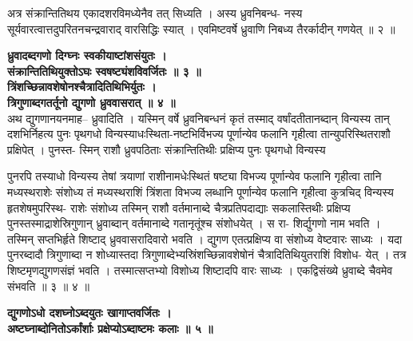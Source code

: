 \documentclass[11pt, openany]{book}
\begin{document}
{{{{\vspace{2mm}
\justifying
 अत्र संक्रान्तितिथय एकादशरविमध्येनैव तत् सिध्यति । अस्य
ध्रुवनिबन्ध-
नस्य सूर्यवारत्वात्तदुपरितनचन्द्रवाराद् वारसिद्धिः स्यात् ।
एवमिष्टवर्षे ध्रुवाणि 
निबध्य तैरर्कादीन् गणयेत् ॥ २ ॥

\vspace{2mm}
\centering
\hspace{-0.75cm}
\textbf{
 ध्रुवादब्दगणो दिग्घ्नः स्वकीयाष्टांशसंयुतः ।\\ 
 \hspace{0.8cm}
 संक्रान्तितिथियुक्तोऽघः स्वषष्ट्यंशविवर्जितः ॥ ३ ॥ \\
 \hspace{-0.75cm}
 त्रिंशच्छिन्नावशेषोनश्चैत्रादितिथिभिर्युतः ।\\
 \hspace{0.3cm}
 त्रिगुणाब्दगतर्तूनो द्युगणो ध्रुववासरात् ॥ ४ ॥ }\\

\vspace{2mm}
\justifying
 अथ द्युगणानयनमाह-- ध्रुवादिति । यस्मिन् वर्षे ध्रुवनिबन्धनं कृतं
तस्माद् 
वर्षांदतीतानब्दान् विन्यस्य तान् दशभिर्निहत्य पुनः पृथगधो
विन्यस्याधःस्थिता-नष्टभिर्विभज्य पूर्णान्येव फलानि गृहीत्वा तान्युपरिस्थितराशौ
प्रक्षिपेत् । पुनस्त-
स्मिन् राशौ ध्रुवपठिताः संक्रान्तितिथीः प्रक्षिप्य पुनः पृथगधो विन्यस्य


\newpage

\justifying
पुनरपि तस्याधो विन्यस्य तेषां त्रयाणां राशीनामधेःस्थितं षष्ट्या विभज्य
पूर्णान्येव फलानि गृहीत्वा तानि मध्यस्थराशेः संशोध्य तं मध्यस्थराशिं त्रिंशता
विभज्य लब्धानि पूर्णान्येव फलानि गृहीत्वा कुत्रचिद् विन्यस्य
हृतशेषमुपरिस्थ-
राशेः संशोध्य तस्मिन् राशौ वर्तमानाब्दे चैत्रप्रतिपदाद्याः सकलास्तिथीः
प्रक्षिप्य 
पुनस्तस्माद्राशेस्रिगुणान् ध्रुवाब्दान् वर्तमानाब्दे गतानृतूंश्च
संशोधयेत् । स रा-
शिर्द्युगणो नाम भवति । तस्मिन् सप्तभिर्हृते शिष्टाद् ध्रुववासरादिवारो
भवति । 
द्युगण एतत्प्रक्षिप्य वा संशोध्य वेष्टवारः साध्यः । यदा पुनरब्दादौ
त्रिगुणाब्दा 
न शोध्यास्तदा त्रिगुणाब्देभ्यस्रिंशच्छिन्नावशेषोनं चैत्रादितिथियुतराशिं
विशोध-
येत् । तत्र शिष्टमृणद्युगणसंज्ञं भवति । तस्मात्सप्तभ्यो विशोध्य
शिष्टादपि वारः 
साध्यः । एकद्विसंख्ये ध्रुवाब्दे चैवमेव संभवति ॥ ३ ॥ ४ ॥ 

\vspace{2mm}
\centering
\hspace{-1.75cm}
\textbf{
\hspace{-0.5cm}
 द्युगणोऽधो दशघ्नोऽब्दयुतः खागाप्तवर्जितः । \\
 अष्टघ्नाब्दोनितोऽर्कांर्शाः प्रक्षेप्योऽब्दाष्टमः कलाः ॥ ५ ॥ }\\
 
}}}}
\end{document}
